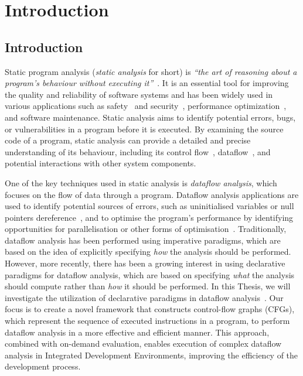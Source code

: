\chapter{Introduction}
\section{Introduction}

Static program analysis (\emph{static analysis} for short) is 
\emph{``the art of reasoning about a program's behaviour without executing it''}~\cite{spa}.
It is an essential tool for improving the quality and reliability of software
systems and has been widely used in various applications such
as safety~\cite{cousot2005astree,Blanchet2002} and security~\cite{piskachev2021secucheck,flowDroid,ayewah2008using,dura2021javadl,fink2012wala},
performance optimization~\cite{aho2007compilers,appel2004modern}, and software maintenance.
Static analysis aims to identify potential errors, bugs, or vulnerabilities
in a program before it is executed.
By examining the source code of a program, static 
analysis can provide a detailed and precise understanding of its behaviour, including
its control flow~\cite{allen1970control}, dataflow~\cite{kam1977monotone}, 
and potential interactions with other system components.



One of the key techniques used in static analysis is \emph{dataflow analysis},
which focuses on the flow of data through a program. Dataflow analysis applications are used to identify
potential sources of errors, such as uninitialised variables or null pointers dereference~\cite{riouak2021precise,10.1016/j.scico.2012.02.002}, 
and to optimise the program's performance by identifying opportunities for 
parallelisation or other forms of optimisation~\cite{aho2007compilers}.
Traditionally, dataflow analysis has been performed using imperative paradigms, 
which are based on the idea of explicitly specifying \emph{how} the analysis should be 
performed. 
However, more recently, there has been a growing interest in using 
declarative paradigms for dataflow analysis, which are based on specifying \emph{what}
the analysis should compute rather than \emph{how} it should be performed.
In this Thesis, we will investigate the utilization of declarative paradigms in 
dataflow analysis~\cite{smits2020flowspec,madsen2016programming}. Our focus is to 
create a novel framework that constructs control-flow graphs (CFGs), which represent the 
sequence of executed instructions in a program, to perform dataflow analysis in a 
more effective and efficient manner. This approach, combined with on-demand evaluation, 
enables execution of complex dataflow analysis in Integrated Development Environments,
improving the efficiency of the development process.

